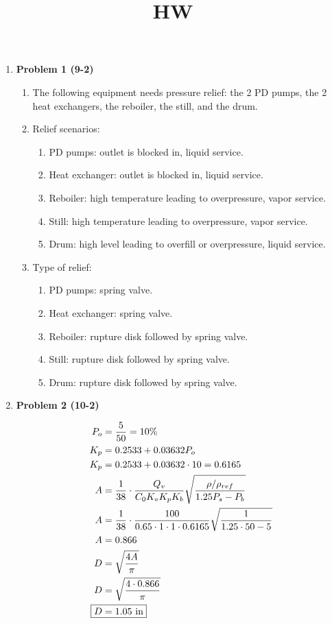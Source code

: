 \documentclass[12pt]{article}
\title{HW}
\date{}
\begin{document}
\begin{enumerate}
    \item \textbf{Problem 1 (9-2)}
    
    \begin{enumerate}
        \item The following equipment needs pressure relief: the 2 PD pumps, the 2 heat exchangers, the reboiler, the still, and the drum.
        
        \item Relief scenarios:
        
        \begin{enumerate}
            \item[-] PD pumps: outlet is blocked in, liquid service.
            \item[-] Heat exchanger: outlet is blocked in, liquid service.
            \item[-] Reboiler: high temperature leading to overpressure, vapor service.
            \item[-] Still: high temperature leading to overpressure, vapor service.
            \item[-] Drum: high level leading to overfill or overpressure, liquid service.
        \end{enumerate}

        \item Type of relief:
        
        \begin{enumerate}
            \item[-] PD pumps: spring valve.
            \item[-] Heat exchanger: spring valve.
            \item[-] Reboiler: rupture disk followed by spring valve.
            \item[-] Still: rupture disk followed by spring valve.
            \item[-] Drum: rupture disk followed by spring valve.
        \end{enumerate}

    \end{enumerate}

    \newpage
    \item \textbf{Problem 2 (10-2)}
    
    \begin{align*}
        P_o &= \frac{5}{50} = 10\% \\
        K_p &= 0.2533 + 0.03632 P_o \\
        K_p &= 0.2533 + 0.03632 \cdot 10 = 0.6165 \\
        A &= \frac{1}{38} \cdot \frac{Q_v}{C_0 K_v K_p K_b} \sqrt{\frac{\rho/\rho_{ref}}{1.25P_s-P_b}} \\
        A &= \frac{1}{38} \cdot \frac{100}{0.65 \cdot 1 \cdot 1 \cdot 0.6165} \sqrt{\frac{1}{1.25\cdot50-5}} \\
        A &= 0.866 \\
        D &= \sqrt{\frac{4 A}{\pi}} \\
        D &= \sqrt{\frac{4 \cdot 0.866}{\pi}} \\
        \Aboxed{D &= 1.05 \text{ in}}
    \end{align*}


\end{enumerate}
\end{document}
